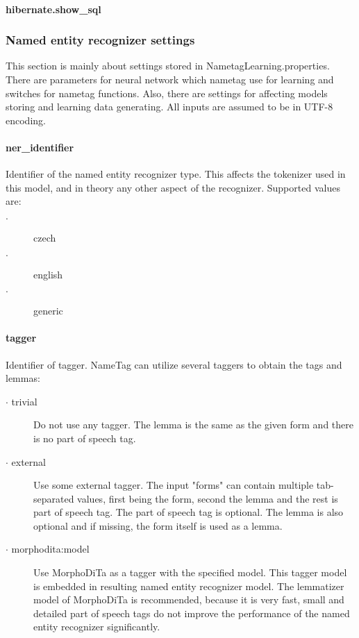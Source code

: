 \documentclass[12pt,a4paper]{report}
\begin{document}
\paragraph{hibernate.show\_sql}

\subsubsection{Named entity recognizer settings}
This section is mainly about settings stored in NametagLearning.properties.
There are parameters for neural network which nametag use for learning and switches for nametag functions.
Also, there are settings for affecting models storing and learning data generating.
All inputs are assumed to be in UTF-8 encoding.


\paragraph{ner\_identifier}
Identifier of the named entity recognizer type. This affects the tokenizer used in this model, and in theory any other aspect of the recognizer. Supported values are:
\begin{description}
\item[$\cdot$] czech
\item[$\cdot$] english
\item[$\cdot$] generic
\end{description}

\paragraph{tagger}
Identifier of tagger. NameTag can utilize several taggers to obtain the tags and lemmas:

\begin{description}
\item[$\cdot$ trivial] Do not use any tagger. The lemma is the same as the given form and there is no part of speech tag.
\item[$\cdot$ external] Use some external tagger. The input "forms" can contain multiple tab-separated values, first being the form, second the lemma and the rest is part of speech tag. The part of speech tag is optional. The lemma is also optional and if missing, the form itself is used as a lemma.
\item[$\cdot$ morphodita:model] Use MorphoDiTa as a tagger with the specified model. This tagger model is embedded in resulting named entity recognizer model. The lemmatizer model of MorphoDiTa is recommended, because it is very fast, small and detailed part of speech tags do not improve the performance of the named entity recognizer significantly.
\end{description}
\end{document}
